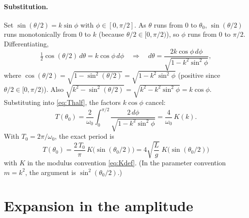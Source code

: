 \documentclass{article}
\begin{document}
\paragraph{Substitution.}
Set $\sin(\theta/2) = k\sin\phi$ with $\phi \in [0,\pi/2]$. As $\theta$ runs
from $0$ to $\theta_0$, $\sin(\theta/2)$ runs monotonically from $0$ to $k$
(because $\theta/2 \in [0,\pi/2)$), so $\phi$ runs from $0$ to $\pi/2$.
Differentiating,
\begin{equation}
  \tfrac12 \cos(\theta/2)\, d\theta = k\cos\phi \, d\phi
  \quad\Longrightarrow\quad
  d\theta = \frac{2k\cos\phi\, d\phi}{\sqrt{1 - k^2\sin^2\phi}},
  \label{eq:dtheta}
\end{equation}
where $\cos(\theta/2) = \sqrt{1-\sin^2(\theta/2)} = \sqrt{1-k^2\sin^2\phi}$
(positive since $\theta/2\in[0,\pi/2)$). Also
$\sqrt{k^2 - \sin^2(\theta/2)} = \sqrt{k^2 - k^2\sin^2\phi} = k\cos\phi$.
Substituting into \eqref{eq:Thalf}, the factors $k\cos\phi$ cancel:
\begin{equation}
  T(\theta_0) = \frac{2}{\omega_0}\int_0^{\pi/2}
    \frac{2\,d\phi}{\sqrt{1-k^2\sin^2\phi}}
  = \frac{4}{\omega_0}\, K(k).
  \label{eq:Texact0}
\end{equation}
With $T_0 = 2\pi/\omega_0$, the exact period is
\begin{equation}
  \boxed{\;
  T(\theta_0) = \frac{2\,T_0}{\pi}\, K\!\bigl(\sin(\theta_0/2)\bigr)
  = 4\sqrt{\frac{L}{g}}\; K\!\bigl(\sin(\theta_0/2)\bigr)
  \;}
  \label{eq:Texact}
\end{equation}
with $K$ in the modulus convention \eqref{eq:Kdef}. (In the parameter
convention $m = k^2$, the argument is $\sin^2(\theta_0/2)$.)

\section{Expansion in the amplitude}
\end{document}
